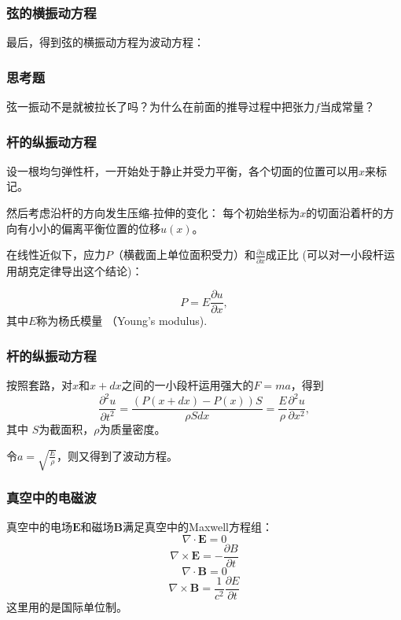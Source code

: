 \documentclass[CJK]{beamer}
\begin{document}
\begin{frame}
\frametitle{弦的横振动方程}

最后，得到弦的横振动方程为波动方程：

\end{frame}


\begin{frame}
\frametitle{思考题}


弦一振动不是就被拉长了吗？为什么在前面的推导过程中把张力$f$当成常量？

\end{frame}


\begin{frame}
\frametitle{杆的纵振动方程}

设一根均匀弹性杆，一开始处于静止并受力平衡，各个切面的位置可以用$x$来标记。

然后考虑沿杆的方向发生压缩-拉伸的变化： 每个初始坐标为$x$的切面沿着杆的方向有小小的偏离平衡位置的位移$u(x)$。


在线性近似下，应力$P$（横截面上单位面积受力）和$\frac{\partial u}{\partial x}$成正比 (可以对一小段杆运用胡克定律导出这个结论)：

$$ P = E\frac{\partial u}{\partial x},$$
其中$E$称为杨氏模量 （Young's modulus).


\end{frame}



\begin{frame}
\frametitle{杆的纵振动方程}


按照套路，对$x$和$x+dx$之间的一小段杆运用强大的$F=ma$，得到
$$ \frac{\partial^2u}{\partial t^2} = \frac{(P(x+dx)-P(x))S}{\rho S dx} = \frac{E}{\rho} \frac{\partial^2u}{\partial x^2},$$
其中 $S$为截面积，$\rho$为质量密度。

\skipline

令$a = \sqrt{\frac{E}{\rho}}$，则又得到了波动方程。



\end{frame}


\begin{frame}
  \frametitle{真空中的电磁波}
  真空中的电场$\mathbf{E}$和磁场$\mathbf{B}$满足真空中的Maxwell方程组：
  $$\nabla\cdot\mathbf{E} = 0 $$
  $$\nabla\times \mathbf{E} = -\frac{\partial B}{\partial t}$$
  $$\nabla\cdot\mathbf{B} = 0 $$  
  $$\nabla\times \mathbf{B} = \frac{1}{c^2}\frac{\partial E}{\partial t}$$
  这里用的是国际单位制。
\end{frame}
\end{document}
